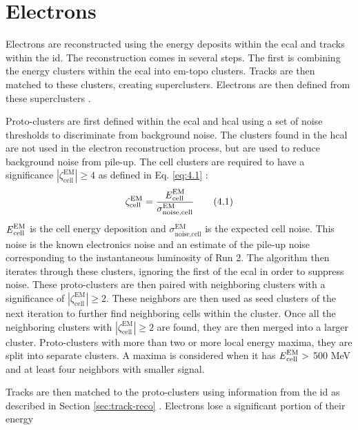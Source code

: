 \section{Electrons}\label{sec:ele-reco}

Electrons are reconstructed using the energy deposits within the \gls{ecal} and tracks within the \gls{id}. The reconstruction comes in several steps. The first is combining the 
energy clusters within the \gls{ecal} into \gls{em}-topo clusters. Tracks are then matched to these clusters, creating superclusters. Electrons are then defined from these 
superclusters \cite{ele-reco}. 
\par
Proto-clusters are first defined within the \gls{ecal} and \gls{hcal} using a set of noise thresholds to discriminate from background noise. The clusters found in the \gls{hcal}
are not used in the electron reconstruction process, but are used to reduce background noise from pile-up. The cell clusters are required to 
have a significance $|\zeta^{\textrm{EM}}_{\textrm{cell}}| \ge \textrm{4}$ as defined in Eq. \ref{eq:4.1} \cite{ele-reco}:
%
\begin{equation}\label{eq:4.1}
    \zeta^{\textrm{EM}}_{\textrm{cell}} = \frac{\textrm{\textit{E}}^{\textrm{EM}}_{\textrm{cell}}}{\sigma^{\textrm{EM}}_{\textrm{noise,cell}}} 
\tag{4.1}
\end{equation}
%
$\textrm{\textit{E}}^{\textrm{EM}}_{\textrm{cell}}$ is the cell energy deposition and $\sigma^{\textrm{EM}}_{\textrm{noise,cell}}$ is the expected cell noise. This noise is 
the known electronics noise and an estimate of the pile-up noise corresponding to the instantaneous luminosity of Run 2. The algorithm then iterates through these clusters,
ignoring the first of the \gls{ecal} in order to suppress noise. These proto-clusters are then paired with neighboring clusters with a significance of $|\zeta^{\textrm{EM}}_{\textrm{cell}}| \ge \textrm{2}$.
These neighbors are then used as seed clusters of the next iteration to further find neighboring cells within the cluster. Once all the neighboring clusters with
$|\zeta^{\textrm{EM}}_{\textrm{cell}}| \ge \textrm{2}$ are found, they are then merged into a larger cluster. Proto-clusters with more than two or more local energy maxima, 
they are split into separate clusters. A maxima is considered when it has $\textrm{\textit{E}}^{\textrm{EM}}_{\textrm{cell}} >$ 500 MeV and at least four neighbors with 
smaller signal.   
\par
Tracks are then matched to the proto-clusters using information from the \gls{id} as described in Section \ref{sec:track-reco} \cite{ele-reco-2015}. Electrons lose a significant portion of their energy 
